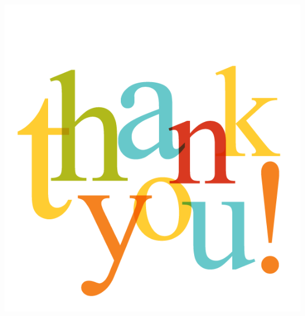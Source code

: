 \documentclass[xcolor=dvipsnames]{beamer}
\begin{document}
\begin{frame}\frametitle{}
  \centering
    \includegraphics[scale=0.3]{images/thankyou}
    
\end{frame}

      
\end{document}

